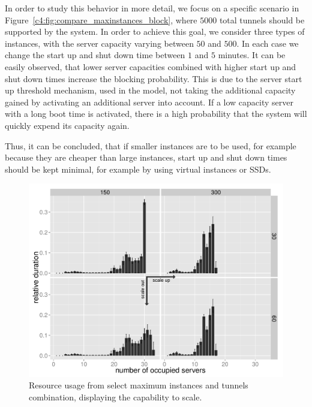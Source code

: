 In order to study this behavior in more detail, we focus on a specific scenario in Figure~\ref{c4:fig:compare_maxinstances_block}, where $5000$ total tunnels should be supported by the system. In order to achieve this goal, we consider three types of instances, with the server capacity varying between $50$ and $500$.  In each case we change the start up and shut down time between $1$ and $5$ minutes. It can be easily observed, that lower server capacities combined with higher start up and shut down times increase the blocking probability. This is due to the server start up threshold mechanism, used in the model, not taking the additional capacity gained by activating an additional server into account. If a low capacity server with a long boot time is activated, there is a high probability that the system will quickly expend its capacity again.

Thus, it can be concluded, that if smaller instances are to be used, for example because they are cheaper than large instances, start up and shut down times should be kept minimal, for example by using virtual instances or \glspl{SSD}.





\begin{figure}[htb]
  \centering
  \includegraphics[width=1.0\textwidth]{images/resourceusedistribution-detail-barplot-annotated.pdf}
  \caption{Resource usage from select maximum instances and tunnels combination, displaying the capability to scale.}
 \label{c4:fig:res-usage-barplot}
\end{figure}



